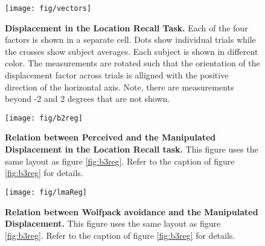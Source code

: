 \documentclass[10pt]{article}
\begin{document}
\begin{figure}[!ht]
\begin{center}
\texttt{[image: fig/vectors]}
\end{center}
\caption{
{\bf Displacement in the Location Recall Task.}
Each of the four factors is shown in a separate cell. Dots show individual trials while the crosses show subject averages. Each subject is shown in different color. The measurements are rotated such that the orientation of the displacement factor across trials is alligned with the positive direction of the horizontal axis. Note, there are measurements beyond -2 and 2 degrees that are not shown.
}\label{fig:vec}
\end{figure}

\begin{figure}[!ht]
\begin{center}
\texttt{[image: fig/b2reg]}
\end{center}
\caption{
{\bf Relation between Perceived and the Manipulated Displacement in the Location Recall task.}
This figure uses the same layout as figure \ref{fig:b3reg}. Refer to the caption of figure \ref{fig:b3reg} for details.
}\label{fig:b2reg}
\end{figure}

\begin{figure}[!ht]
\begin{center}
\texttt{[image: fig/lmaReg]}
\end{center}
\caption{
{\bf Relation between Wolfpack avoidance and the Manipulated Displacement.}
This figure uses the same layout as figure \ref{fig:b3reg}. Refer to the caption of figure \ref{fig:b3reg} for details.
}\label{fig:lmaReg}
\end{figure}
\end{document}
